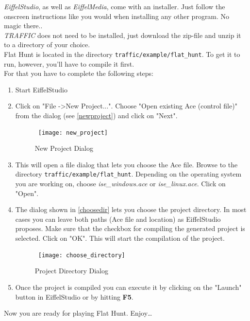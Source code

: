 \emph{EiffelStudio}, as well as \emph{EiffelMedia}, come with an installer. Just follow the onscreen instructions like you would when installing any other program. No magic there..\\

\emph{TRAFFIC} does not need to be installed, just download the zip-file and unzip it to a directory of your choice.\\ 
Flat Hunt is located in the directory \texttt{traffic/example/flat\_hunt}. To get it to run, however, you'll have to compile it first.\\

For that you have to complete the following steps:

\begin {enumerate}
	\item{Start EiffelStudio}
	\item{Click on "File ->New Project...". Choose "Open existing Ace (control file)" from the dialog (see \autoref{newproject}) and click on "Next".
\begin{figure}[h]
\centerline{\hbox{  
\texttt{[image: new\_project]}
  }}
\caption{New Project Dialog}
\label{newproject}
\end{figure}	  
}
	\item {This will open a file dialog that lets you choose the Ace file. Browse to the directory \texttt{traffic/example/flat\_hunt}. Depending on the operating system you are working on, choose \emph{ise\_windows.ace} or \emph{ise\_linux.ace}. Click on "Open". }
	\item{The dialog shown in \autoref{choosedir} lets you choose the project directory. In most cases you can leave both paths (Ace file and location) as EiffelStudio proposes. Make sure that the checkbox for compiling the generated project is selected. Click on "OK". This will start the compilation of the project.
\begin{figure}[h]
\centerline{\hbox{  
\texttt{[image: choose\_directory]}
  }}
\caption{Project Directory Dialog}
\label{choosedir}
\end{figure}
}
	\item{Once the project is compiled you can execute it by clicking on the "Launch" button in EiffelStudio or by hitting \textbf{F5}.}
\end {enumerate}

Now you are ready for playing Flat Hunt. Enjoy\ldots 

